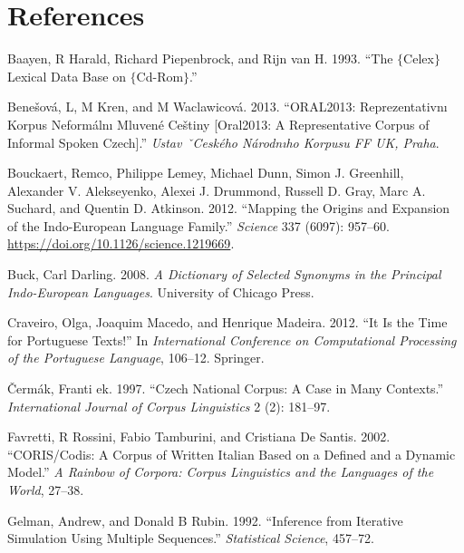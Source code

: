 \documentclass[]{article}
\begin{document}
\hypertarget{references}{%
\section*{References}\label{references}}

\hypertarget{refs}{}
\leavevmode\hypertarget{ref-baayen1993celex}{}%
Baayen, R Harald, Richard Piepenbrock, and Rijn van H. 1993. ``The
\(\{\)Celex\(\}\) Lexical Data Base on \(\{\)Cd-Rom\(\}\).''

\leavevmode\hypertarget{ref-benevsova2013oral2013}{}%
Benešová, L, M Kren, and M Waclawicová. 2013. ``ORAL2013:
Reprezentativnı Korpus Neformálnı Mluvené Ceštiny {[}Oral2013: A
Representative Corpus of Informal Spoken Czech{]}.'' \emph{Ustav
ˇCeského Národnıho Korpusu FF UK, Praha}.

\leavevmode\hypertarget{ref-bouckaert_mapping_2012}{}%
Bouckaert, Remco, Philippe Lemey, Michael Dunn, Simon J. Greenhill,
Alexander V. Alekseyenko, Alexei J. Drummond, Russell D. Gray, Marc A.
Suchard, and Quentin D. Atkinson. 2012. ``Mapping the Origins and
Expansion of the Indo-European Language Family.'' \emph{Science} 337
(6097): 957--60. \url{https://doi.org/10.1126/science.1219669}.

\leavevmode\hypertarget{ref-buck}{}%
Buck, Carl Darling. 2008. \emph{A Dictionary of Selected Synonyms in the
Principal Indo-European Languages}. University of Chicago Press.

\leavevmode\hypertarget{ref-craveiro2012time}{}%
Craveiro, Olga, Joaquim Macedo, and Henrique Madeira. 2012. ``It Is the
Time for Portuguese Texts!'' In \emph{International Conference on
Computational Processing of the Portuguese Language}, 106--12. Springer.

\leavevmode\hypertarget{ref-ek1997czech}{}%
Čermák, Franti ek. 1997. ``Czech National Corpus: A Case in Many
Contexts.'' \emph{International Journal of Corpus Linguistics} 2 (2):
181--97.

\leavevmode\hypertarget{ref-favretti2002coris}{}%
Favretti, R Rossini, Fabio Tamburini, and Cristiana De Santis. 2002.
``CORIS/Codis: A Corpus of Written Italian Based on a Defined and a
Dynamic Model.'' \emph{A Rainbow of Corpora: Corpus Linguistics and the
Languages of the World}, 27--38.

\leavevmode\hypertarget{ref-gelman1992inference}{}%
Gelman, Andrew, and Donald B Rubin. 1992. ``Inference from Iterative
Simulation Using Multiple Sequences.'' \emph{Statistical Science},
457--72.
\end{document}
